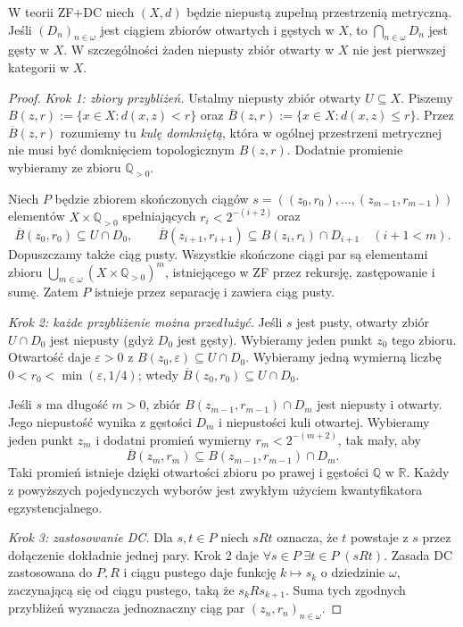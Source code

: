 \begin{twierdzenie}
\label{thm:weak-choice-baire-dc}
W teorii ZF+$\mathrm{DC}$ niech $(X,d)$ będzie
niepustą zupełną przestrzenią metryczną.
Jeśli $(D_n)_{n\in\omega}$ jest ciągiem
zbiorów otwartych i gęstych w $X$,
to $\bigcap_{n\in\omega}D_n$ jest gęsty w $X$.
W szczególności żaden niepusty zbiór otwarty
w $X$ nie jest pierwszej kategorii w $X$.
\end{twierdzenie}
\begin{proof}
\emph{Krok 1: zbiory przybliżeń.}
Ustalmy niepusty zbiór otwarty $U\subseteq X$.
Piszemy
$B(z,r):=\{x\in X:d(x,z)<r\}$
oraz
$\overline B(z,r):=\{x\in X:d(x,z)\le r\}$.
Przez $\overline B(z,r)$ rozumiemy tu
\emph{kulę domkniętą}, która w ogólnej
przestrzeni metrycznej nie musi być
domknięciem topologicznym $B(z,r)$.
Dodatnie promienie wybieramy ze zbioru
$\mathbb Q_{>0}$.

Niech $P$ będzie zbiorem skończonych ciągów
$s=((z_0,r_0),\ldots,(z_{m-1},r_{m-1}))$
elementów $X\times\mathbb Q_{>0}$ spełniających
$r_i<2^{-(i+2)}$ oraz
\[
\overline B(z_0,r_0)\subseteq U\cap D_0,\qquad
\overline B(z_{i+1},r_{i+1})
 \subseteq B(z_i,r_i)\cap D_{i+1}
\quad(i+1<m).
\]
Dopuszczamy także ciąg pusty.
Wszystkie skończone ciągi par są elementami
zbioru
$\bigcup_{m\in\omega}(X\times\mathbb Q_{>0})^m$,
istniejącego w ZF przez rekursję,
zastępowanie i sumę.
Zatem $P$ istnieje przez separację
i zawiera ciąg pusty.

\emph{Krok 2: każde przybliżenie można przedłużyć.}
Jeśli $s$ jest pusty,
otwarty zbiór $U\cap D_0$ jest niepusty
(gdyż $D_0$ jest gęsty).
Wybieramy jeden punkt $z_0$ tego zbioru.
Otwartość daje $\varepsilon>0$ z
$B(z_0,\varepsilon)\subseteq U\cap D_0$.
Wybieramy jedną wymierną liczbę
$0<r_0<\min(\varepsilon,1/4)$;
wtedy
$\overline B(z_0,r_0)\subseteq U\cap D_0$.

Jeśli $s$ ma długość $m>0$, zbiór
$B(z_{m-1},r_{m-1})\cap D_m$
jest niepusty i otwarty.
Jego niepustość wynika z gęstości $D_m$
i niepustości kuli otwartej.
Wybieramy jeden punkt $z_m$ i dodatni
promień wymierny
$r_m<2^{-(m+2)}$, tak mały, aby
\[
\overline B(z_m,r_m)
\subseteq B(z_{m-1},r_{m-1})\cap D_m.
\]
Taki promień istnieje dzięki otwartości
zbioru po prawej i gęstości $\mathbb Q$ w $\mathbb R$.
Każdy z powyższych pojedynczych wyborów
jest zwykłym użyciem kwantyfikatora egzystencjalnego.

\emph{Krok 3: zastosowanie DC.}
Dla $s,t\in P$ niech $sRt$ oznacza, że
$t$ powstaje z $s$ przez dołączenie dokładnie
jednej pary. Krok 2 daje
$\forall s\in P\;\exists t\in P\;(sRt)$.
Zasada $\mathrm{DC}$ zastosowana do $P,R$
i ciągu pustego daje funkcję
$k\mapsto s_k$ o dziedzinie $\omega$,
zaczynającą się od ciągu pustego,
taką że $s_kRs_{k+1}$.
Suma tych zgodnych przybliżeń wyznacza
jednoznaczny ciąg par
$(z_n,r_n)_{n\in\omega}$.


\end{proof}
